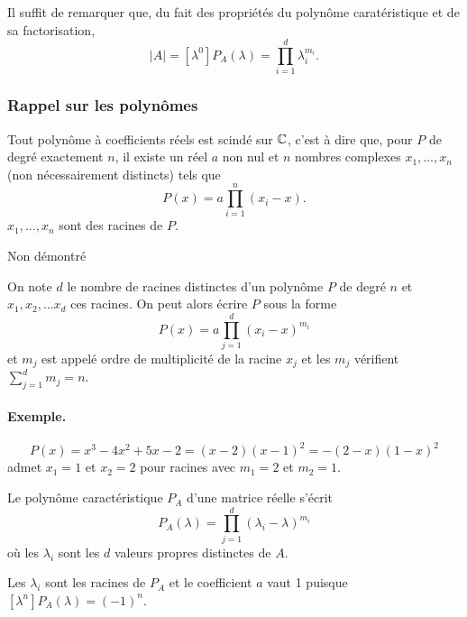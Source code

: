 \proof
  Il suffit de remarquer que, du fait des propriétés du polynôme caratéristique et de sa factorisation, 
  $$
  |A| = [\lambda^0]P_A(\lambda) = \prod_{i=1}^d \lambda_i^{m_i}.
  $$
\eproof

\subsubsection{Rappel sur les polynômes} 

\begin{proposition*}
  Tout polynôme à coefficients réels est scindé sur $\mathbb{C}$, c'est à dire que, pour $P$ de degré exactement $n$, il existe un réel $a$ non nul et $n$ nombres complexes $x_1, \dots, x_n$ (non nécessairement distincts) tels que
  $$
  P(x) = a \prod_{i=1}^n (x_i - x).
  $$
  $x_1, \dots, x_n$ sont des racines de $P$.
\end{proposition*}

\proof
Non démontré
\eproof

\begin{definition*}
  On note $d$ le nombre de racines distinctes d'un polynôme $P$ de degré $n$ et $x_1, x_2, \dots x_d$ ces racines. On peut alors écrire $P$ sous la forme
  $$
  P(x) = a \prod_{j=1}^d (x_i - x)^{m_i}
  $$
  et $m_j$ est appelé ordre de multiplicité de la racine $x_j$ et les $m_j$ vérifient $ \sum_{j=1}^d m_j = n$.
\end{definition*}

\paragraph*{Exemple.} 
$$
P(x) = x^3 - 4x^2 + 5x - 2 = (x-2)(x-1)^2 = - (2-x)(1-x)^2
$$ 
admet $x_1 = 1$ et $x_2 = 2$ pour racines avec $m_1 = 2$ et $m_2 = 1$.


\begin{corollary*}
  Le polynôme caractéristique $P_A$ d'une matrice réelle s'écrit
  $$
  P_A(\lambda) = \prod_{j=1}^d (\lambda_i - \lambda)^{m_i}
  $$
  où les $\lambda_i$ sont les $d$ valeurs propres distinctes de $A$.
\end{corollary*}

\proof
Les $\lambda_i$ sont les racines de $P_A$ et le coefficient $a$ vaut 1 puisque $[\lambda^n]P_A(\lambda) = (-1)^n$.
\eproof


